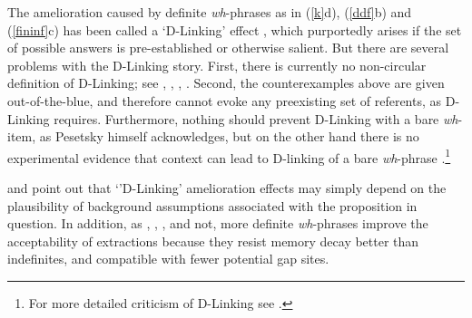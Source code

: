 \documentclass[output=paper]{langsci/langscibook}
\begin{document}
The amelioration caused by definite \emph{wh}-phrases as in  (\ref{k}d), (\ref{ddf}b) and (\ref{fininf}c) 
has been called a `D-Linking' effect  \citep{pesetskydlink,pesetskybook}, which purportedly arises if the set of possible answers is pre-established or otherwise salient. But there are several problems with the D-Linking story.   First, there is currently no non-circular definition of D-Linking; see 
\citet[16]{pesetskybook},
 \citet[247--250]{ginzsag}, 
 \citet[33, 39]{chung94},
\citet[242, 268--271]{levhubook}. Second, the counterexamples above are given out-of-the-blue, and therefore cannot evoke any preexisting set of referents, as D-Linking 
requires.   Furthermore, nothing should prevent D-Linking with a bare \emph{wh}-item, as Pesetsky himself acknowledges, but on the other hand there is no experimental evidence that context can lead to D-linking of a bare \emph{wh}-phrase \citep{sprousediss07,villata}.\footnote{For more detailed criticism of D-Linking see \citet{hof2007}.}

 \citet{kroch89} and \citet[270]{levhubook} point out that `'D-Linking' amelioration effects  may simply depend on the plausibility of background assumptions associated with the proposition in question. In addition, as \citet{kluenderkustas}, \citet{saghof}, \citet{philcls}, \citet{philipt07} and \citet{hofsaglang} not,  more definite \emph{wh}-phrases improve the  acceptability of  extractions because they resist memory decay better than indefinites, and compatible with fewer potential gap sites. 
\end{document}
